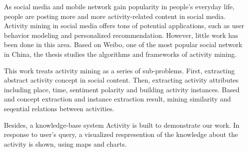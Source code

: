 
\begin{eabstract} 
As social media and mobile network gain popularity in people's everyday life, people are posting more and more activity-related content in social media. Activity mining in social media offers tons of potential applications, such as user behavior modeling and personalized recommendation. However, little work has been done in this area. Based on Weibo, one of the most popular social network in China, the thesis studies the algorithms and frameworks of activity mining.

This work treats activity mining as a series of sub-problems. First, extracting abstract activity concept in social content. Then, extracting activity attributes including place, time, sentiment polarity and building activity instances. Based and concept extraction and instance extraction result, mining similarity and seqential relations between activities.

Besides, a knowledge-base system Activity is built to demonstrate our work. In response to user's query, a visualized respresention of the knowledge about the activity is shown, using maps and charts.
\end{eabstract}

